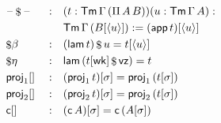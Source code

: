 \documentclass{article}
\begin{document}
\begin{multicols}{3}
\begin{alignat*}{5}
  & \blank\oldapp\blank && : && (t:\Tm\,\Gamma\,(\Pi\,A\,B))(u : \Tm\,\Gamma\,A): \\
  & && && \Tm\,\Gamma\,(B[\lb u\rb]) := (\app\,t)[\lb u \rb] \\
  & {{\oldapp}\beta} && : && (\lam\,t)\oldapp u = t[\lb u\rb] \\
  & {{\oldapp}\eta} && : && \lam\,(t[\wk]\oldapp \vz) = t \\
  & {\proj_1[]} && : && (\proj_1\,t)[\sigma] = \proj_1\,(t[\sigma]) \\
  & {\proj_2[]} && : && (\proj_2\,t)[\sigma] = \proj_2\,(t[\sigma]) \\
  & {\c[]} && : && (\c\,A)[\sigma] = \c\,(A[\sigma]) \\
\end{alignat*}
\end{multicols}
\end{document}
